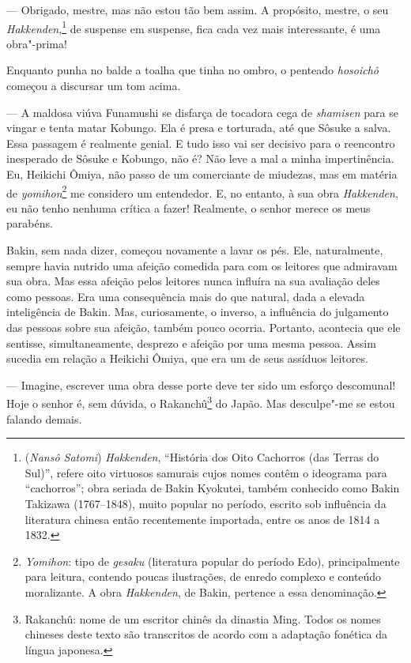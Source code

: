 \sectionitem
--- Obrigado, mestre, mas não estou tão bem assim. A propósito, mestre, o
seu \textit{Hakkenden},\footnote{ (\textit{Nansô Satomi}) \textit{Hakkenden},
``História dos Oito Cachorros (das Terras do Sul)'', refere oito
virtuosos samurais cujos nomes contêm o ideograma para ``cachorros'';
obra seriada de Bakin Kyokutei, também conhecido como Bakin Takizawa 
(1767--1848), muito popular no
período, escrito sob influência da literatura chinesa então
recentemente importada, entre os anos de 1814 a 1832.} de suspense em
suspense, fica cada vez mais interessante, é uma obra"-prima!

Enquanto punha no balde a toalha que tinha no ombro, o penteado
\textit{hosoichô} começou a discursar um tom acima.  

--- A maldosa viúva Funamushi se disfarça de tocadora cega de
\textit{shamisen} para se vingar e tenta matar Kobungo. Ela é presa e
torturada, até que Sôsuke a salva. Essa passagem é realmente genial. E
tudo isso vai ser decisivo para o reencontro inesperado de Sôsuke e
Kobungo, não é? Não leve a mal a minha impertinência. Eu, Heikichi Ômiya, 
não passo de um comerciante de miudezas, mas em matéria de
\textit{yomihon}\footnote{ \textit{Yomihon}: tipo de \textit{gesaku} 
(literatura popular do período Edo), principalmente para leitura,
contendo poucas ilustrações, de enredo complexo e conteúdo moralizante.
A obra \textit{Hakkenden}, de Bakin, pertence a essa denominação.} me
considero um entendedor. E, no entanto, à sua obra \textit{Hakkenden},
eu não tenho nenhuma crítica a fazer! Realmente, o senhor merece os
meus parabéns.

Bakin, sem nada dizer, começou novamente a lavar os pés. Ele,
naturalmente, sempre havia nutrido uma afeição comedida para com os
leitores que admiravam sua obra. Mas essa afeição pelos leitores nunca
influíra na sua avaliação deles como pessoas. Era uma consequência mais
do que natural, dada a elevada inteligência de Bakin. Mas,
curiosamente, o inverso, a influência do julgamento das pessoas sobre
sua afeição, também pouco ocorria. Portanto, acontecia que ele
sentisse, simultaneamente, desprezo e afeição por uma mesma pessoa.
Assim sucedia em relação a Heikichi Ômiya, que era um de seus assíduos leitores.

--- Imagine, escrever uma obra desse porte deve ter sido um esforço
descomunal! Hoje o senhor é, sem dúvida, o Rakanchû\footnote{ Rakanchû:
nome de um escritor chinês da dinastia Ming. Todos os nomes chineses
deste texto são transcritos de acordo com a adaptação fonética da
língua japonesa.} do Japão. Mas desculpe"-me se estou falando demais.


